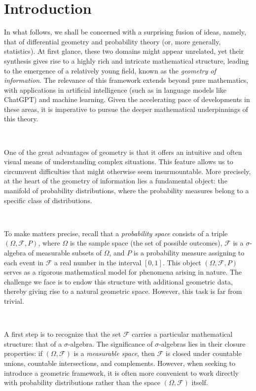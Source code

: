 \chapter{Introduction}

In what follows, we shall be concerned with a surprising fusion of ideas, namely, that of differential geometry and probability theory (or, more generally, statistics). At first glance, these two domains might appear unrelated, yet their synthesis gives rise to a highly rich and intricate mathematical structure, leading to the emergence of a relatively young field, known as the \emph{geometry of information}. The relevance of this framework extends beyond pure mathematics, with applications in artificial intelligence (such as in language models like ChatGPT) and machine learning. Given the accelerating pace of developments in these areas, it is imperative to pursue the deeper mathematical underpinnings of this theory.  

\,

One of the great advantages of geometry is that it offers an intuitive and often visual means of understanding complex situations. This feature allows us to circumvent difficulties that might otherwise seem insurmountable. More precisely, at the heart of the geometry of information lies a fundamental object: the manifold of probability distributions, where the probability measures belong to a specific class of distributions. 

\,

To make matters precise, recall that a \emph{probability space} consists of a triple $(\Omega, \mathcal{F}, P)$, where $\Omega$ is the sample space (the set of possible outcomes), $\mathcal{F}$ is a $\sigma$-algebra of measurable subsets of $\Omega$, and $P$ is a probability measure assigning to each event in $\mathcal{F}$ a real number in the interval $[0,1]$. This object $(\Omega, \mathcal{F}, P)$ serves as a rigorous mathematical model for phenomena arising in nature. The challenge we face is to endow this structure with additional geometric data, thereby giving rise to a natural geometric space. However, this task is far from trivial.  

\,

A first step is to recognize that the set $\mathcal{F}$ carries a particular mathematical structure: that of a $\sigma$-algebra. The significance of $\sigma$-algebras lies in their closure properties: if $(\Omega, \mathcal{F})$ is a \emph{measurable space}, then $\mathcal{F}$ is closed under countable unions, countable intersections, and complements. However, when seeking to introduce a geometric framework, it is often more convenient to work directly with probability distributions rather than the space $(\Omega, \mathcal{F})$ itself.  

